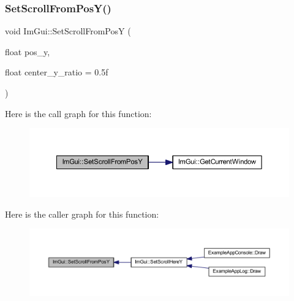 \mbox{\label{namespace_im_gui_a57d8e9497ad39584ba740cef70b78fb4}} 
\subsubsection{\texorpdfstring{Set\+Scroll\+From\+Pos\+Y()}{SetScrollFromPosY()}}
{\footnotesize\ttfamily void Im\+Gui\+::\+Set\+Scroll\+From\+PosY (\begin{DoxyParamCaption}\item[{float}]{pos\+\_\+y,  }\item[{float}]{center\+\_\+y\+\_\+ratio = {\ttfamily 0.5f} }\end{DoxyParamCaption})}

Here is the call graph for this function\+:
\nopagebreak
\begin{figure}[H]
\begin{center}
\leavevmode
\includegraphics[width=350pt]{namespace_im_gui_a57d8e9497ad39584ba740cef70b78fb4_cgraph}
\end{center}
\end{figure}
Here is the caller graph for this function\+:
\nopagebreak
\begin{figure}[H]
\begin{center}
\leavevmode
\includegraphics[width=350pt]{namespace_im_gui_a57d8e9497ad39584ba740cef70b78fb4_icgraph}
\end{center}
\end{figure}
\mbox{\label{namespace_im_gui_ac74487b4d75580ca637659103fef1368}} 
